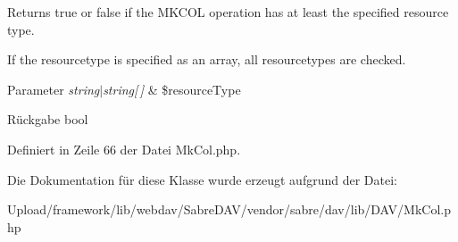 Returns true or false if the M\+K\+C\+OL operation has at least the specified resource type.

If the resourcetype is specified as an array, all resourcetypes are checked.


\begin{DoxyParams}{Parameter}
{\em string$\vert$string\mbox{[}$\,$\mbox{]}} & \$resource\+Type \\
\hline
\end{DoxyParams}
\begin{DoxyReturn}{Rückgabe}
bool 
\end{DoxyReturn}


Definiert in Zeile 66 der Datei Mk\+Col.\+php.



Die Dokumentation für diese Klasse wurde erzeugt aufgrund der Datei\+:\begin{DoxyCompactItemize}
\item 
Upload/framework/lib/webdav/\+Sabre\+D\+A\+V/vendor/sabre/dav/lib/\+D\+A\+V/Mk\+Col.\+php\end{DoxyCompactItemize}
